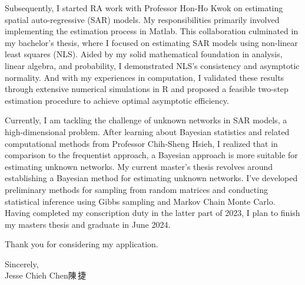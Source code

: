 \documentclass[a4paper]{article}
\begin{document}
Subsequently, I started RA work with Professor Hon-Ho Kwok on estimating spatial auto-regressive (SAR) models.
My responsibilities primarily involved implementing the estimation process in Matlab.
This collaboration culminated in my bachelor's thesis,
where I focused on estimating SAR models using non-linear least squares (NLS).
Aided by my solid mathematical foundation in analysis, linear algebra, and probability,
I demonstrated NLS's consistency and asymptotic normality.
And with my experiences in computation, I validated these results through extensive numerical simulations in R
and proposed a feasible two-step estimation procedure to achieve optimal asymptotic efficiency.

Currently, I am tackling the challenge of unknown networks in SAR models, a high-dimensional problem.
After learning about Bayesian statistics and related computational methods from Professor Chih-Sheng Hsieh,
I realized that in comparison to the frequentist approach,
a Bayesian approach is more suitable for estimating unknown networks.
My current master's thesis revolves around establishing a Bayesian method for estimating unknown networks.
I've developed preliminary methods for sampling from random matrices and
conducting statistical inference using Gibbs sampling and Markov Chain Monte Carlo.
Having completed my conscription duty in the latter part of 2023,
I plan to finish my masters thesis and graduate in June 2024.

\unskip

\vspace{1em}
\noindent
Thank you for considering my application.\\

\vspace{2em}
\hfill
\begin{minipage}{.35\textwidth}
	Sincerely,\\
	Jesse Chieh Chen\hspace{0.5em}陳\,捷
\end{minipage}
\end{document}
